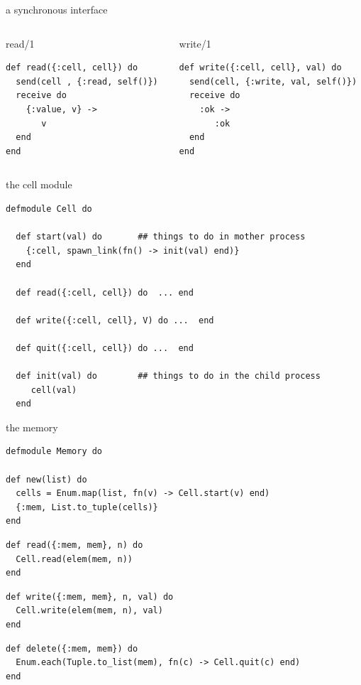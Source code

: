 \begin{frame}[fragile]{a synchronous interface}

\begin{columns}
\begin{column}{.5\linewidth}
\begin{block}{read/1}
 \begin{verbatim}
def read({:cell, cell}) do
  send(cell , {:read, self()})
  receive do
    {:value, v} ->
       v
  end
end
 \end{verbatim}
\end{block}
\end{column}
\pause
\begin{column}{.5\linewidth}
\begin{block}{write/1}
 \begin{verbatim}
def write({:cell, cell}, val) do
  send(cell, {:write, val, self()})
  receive do
    :ok ->
       :ok
  end
end
 \end{verbatim}
\end{block}
\end{column}
\end{columns}

\end{frame}

\begin{frame}[fragile]{the cell module}
\begin{verbatim}
defmodule Cell do

  def start(val) do       ## things to do in mother process
    {:cell, spawn_link(fn() -> init(val) end)}
  end

  def read({:cell, cell}) do  ... end

  def write({:cell, cell}, V) do ...  end

  def quit({:cell, cell}) do ...  end

  def init(val) do        ## things to do in the child process
     cell(val)
  end
\end{verbatim}
\end{frame}

\begin{frame}[fragile]{the memory}

\begin{verbatim}
defmodule Memory do

def new(list) do
  cells = Enum.map(list, fn(v) -> Cell.start(v) end)
  {:mem, List.to_tuple(cells)}
end
\end{verbatim} \pause
\begin{verbatim}
def read({:mem, mem}, n) do
  Cell.read(elem(mem, n))
end
\end{verbatim} \pause
\begin{verbatim}
def write({:mem, mem}, n, val) do
  Cell.write(elem(mem, n), val)
end
\end{verbatim} \pause
\begin{verbatim}
def delete({:mem, mem}) do
  Enum.each(Tuple.to_list(mem), fn(c) -> Cell.quit(c) end)
end
\end{verbatim}
\end{frame}

